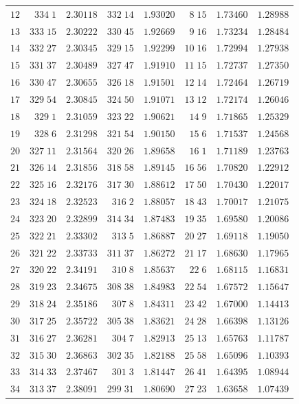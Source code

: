 \begin{center}
\begin{tabular}{r|r|r|r|r|r|r|r}
$12$&$334\;1$&$2.30118$&$332\;14$&$1.93020$&$8\;15$&$1.73460$&$1.28988$\\
$13$&$333\;15$&$2.30222$&$330\;45$&$1.92669$&$9\;16$&$1.73234$&$1.28484$\\
$14$&$332\;27$&$2.30345$&$329\;15$&$1.92299$&$10\;16$&$1.72994$&$1.27938$\\[2pt]
$15$&$331\;37$&$2.30489$&$327\;47$&$1.91910$&$11\;15$&$1.72737$&$1.27350$\\
$16$&$330\;47$&$2.30655$&$326\;18$&$1.91501$&$12\;14$&$1.72464$&$1.26719$\\
$17$&$329\;54$&$2.30845$&$324\;50$&$1.91071$&$13\;12$&$1.72174$&$1.26046$\\
$18$&$329\;1$&$2.31059$&$323\;22$&$1.90621$&$14\;9$&$1.71865$&$1.25329$\\
$19$&$328\;6$&$2.31298$&$321\;54$&$1.90150$&$15\;6$&$1.71537$&$1.24568$\\[2pt]
$20$&$327\;11$&$2.31564$&$320\;26$&$1.89658$&$16\;1$&$1.71189$&$1.23763$\\
$21$&$326\;14$&$2.31856$&$318\;58$&$1.89145$&$16\;56$&$1.70820$&$1.22912$\\
$22$&$325\;16$&$2.32176$&$317\;30$&$1.88612$&$17\;50$&$1.70430$&$1.22017$\\
$23$&$324\;18$&$2.32523$&$316\;2$&$1.88057$&$18\;43$&$1.70017$&$1.21075$\\
$24$&$323\;20$&$2.32899$&$314\;34$&$1.87483$&$19\;35$&$1.69580$&$1.20086$\\[2pt]
$25$&$322\;21$&$2.33302$&$313\;5$&$1.86887$&$20\;27$&$1.69118$&$1.19050$\\
$26$&$321\;22$&$2.33733$&$311\;37$&$1.86272$&$21\;17$&$1.68630$&$1.17965$\\
$27$&$320\;22$&$2.34191$&$310\;8$&$1.85637$&$22\;6$&$1.68115$&$1.16831$\\
$28$&$319\;23$&$2.34675$&$308\;38$&$1.84983$&$22\;54$&$1.67572$&$1.15647$\\
$29$&$318\;24$&$2.35186$&$307\;8$&$1.84311$&$23\;42$&$1.67000$&$1.14413$\\[2pt]
$30$&$317\;25$&$2.35722$&$305\;38$&$1.83621$&$24\;28$&$1.66398$&$1.13126$\\
$31$&$316\;27$&$2.36281$&$304\;7$&$1.82913$&$25\;13$&$1.65763$&$1.11787$\\
$32$&$315\;30$&$2.36863$&$302\;35$&$1.82188$&$25\;58$&$1.65096$&$1.10393$\\
$33$&$314\;33$&$2.37467$&$301\;3$&$1.81447$&$26\;41$&$1.64395$&$1.08944$\\
$34$&$313\;37$&$2.38091$&$299\;31$&$1.80690$&$27\;23$&$1.63658$&$1.07439$\\[2pt]

\end{tabular}
\end{center}
